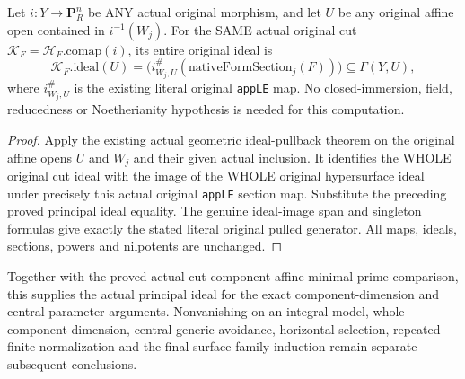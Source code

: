 \begin{theorem}
\label{thm:pl-gauss-original-cut-affine-principal-equation}
\leanok
Let $i:Y\to\mathbf P^n_R$ be ANY actual original morphism, and let
$U$ be any original affine open contained in $i^{-1}(W_j)$. For the
SAME actual original cut $\mathcal K_F=\mathcal H_F.\mathrm{comap}(i)$,
its entire original ideal is
\[
 \mathcal K_F.\mathrm{ideal}(U)
  =\bigl(i^\#_{W_j,U}(\mathrm{nativeFormSection}_j(F))\bigr)
      \subseteq\Gamma(Y,U),
\]
where $i^\#_{W_j,U}$ is the existing literal original \texttt{appLE}
map. No closed-immersion, field, reducedness or Noetherianity hypothesis
is needed for this computation.
\end{theorem}
\begin{proof}
Apply the existing actual geometric ideal-pullback theorem on the
original affine opens $U$ and $W_j$ and their given actual inclusion.
It identifies the WHOLE original cut ideal with the image of the
WHOLE original hypersurface ideal under precisely this actual original
\texttt{appLE} section map. Substitute the preceding proved principal
ideal equality. The genuine ideal-image span and singleton formulas
give exactly the stated literal original pulled generator. All maps,
ideals, sections, powers and nilpotents are unchanged.
\end{proof}

Together with the proved actual cut-component affine minimal-prime
comparison, this supplies the actual principal ideal for the exact
component-dimension and central-parameter arguments. Nonvanishing on an
integral model, whole component dimension, central-generic avoidance,
horizontal selection, repeated finite normalization and the final
surface-family induction remain separate subsequent conclusions.
